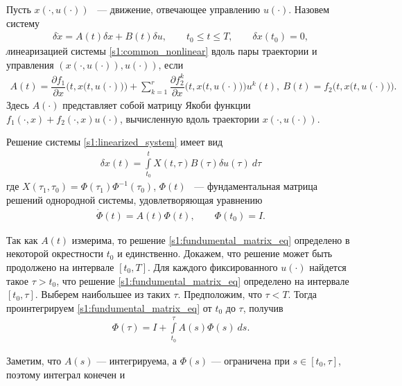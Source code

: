 \documentclass[../main.tex]{subfiles}
\begin{document}
\begin{definition}\label{s1:def:linearized_system}
 Пусть $ x(\cdot,u(\cdot)) $ ~--- движение, отвечающее управлению $ u(\cdot)$.
 Назовем систему
 \begin{gather}\label{s1:linearized_system}
 \delta \dot{x} = A(t) \delta x + B(t) \delta u, \qquad t_0 \leqslant t \leqslant T, \qquad \delta x(t_0) = 0,
 \end{gather}
 {\textit линеаризацией} системы \eqref{s1:common_nonlinear} вдоль пары траектории и управления $\left( x(\cdot,u(\cdot)),u(\cdot)\right) $, если 
 \begin{gather*}
 A(t) = \dfrac{\partial f_1}{\partial x} \Big(t,x\big(t,u(\cdot)\big)\Big) 
 + 
 \sum\limits_{k = 1}^{r}
 \dfrac{\partial f_2^k}{\partial x}\Big(t,x\big(t,u(\cdot)\big)\Big) u^k(t), \ 
 B(t) = f_2 \Big(t,x\big(t,u(\cdot)\big)\Big).
 \end{gather*}
 Здесь $ A(\cdot) $ представляет собой матрицу Якоби функции $ f_1(\cdot, x) + f_2(\cdot, x) u(\cdot) $, вычисленную вдоль траектории $ x(\cdot,u(\cdot)) $.
\end{definition}

Решение системы \eqref{s1:linearized_system} имеет вид 
\begin{gather*}
\delta x(t) = \int\limits_{t_0}^{t} X(t, \tau) B(\tau) \delta u(\tau) \ d\tau 
\end{gather*}
 где $ X(\tau_1,\tau_0)= \Phi(\tau_1) \Phi^{-1}(\tau_0) $, $\Phi(t) $ ~--- фундаментальная матрица решений однородной системы, удовлетворяющая уравнению 
\begin{gather}\label{s1:fundumental_matrix_eq}
 \dot{\Phi}(t) = A(t) \Phi(t), \qquad \Phi(t_0) = I.
\end{gather}

Так как $A(t)$ измерима, то решение \eqref{s1:fundumental_matrix_eq} определено в некоторой окрестности $t_0$ и единственно\cite[с. 46]{Filippov2}. 
Докажем, что решение может быть продолжено на интервале $[t_0, T]$. 
Для каждого фиксированного $u(\cdot) $ найдется такое $\tau > t_0$, что решение \eqref{s1:fundumental_matrix_eq} определено на интервале $ [t_0, \tau] $.
Выберем наибольшее из таких $\tau$.
Предположим, что $\tau < T$. 
Тогда проинтегрируем \eqref{s1:fundumental_matrix_eq} от $t_0$ до $\tau$, получив
\begin{gather*}
 \Phi(\tau) = I + \int\limits_{t_0}^{\tau} A(s) \Phi(s) \ ds.
\end{gather*}

Заметим, что $A(s)$ --- интегрируема, а $ \Phi(s)$ --- ограничена при $s \in [t_0, \tau]$, поэтому интеграл конечен и
\end{document}
